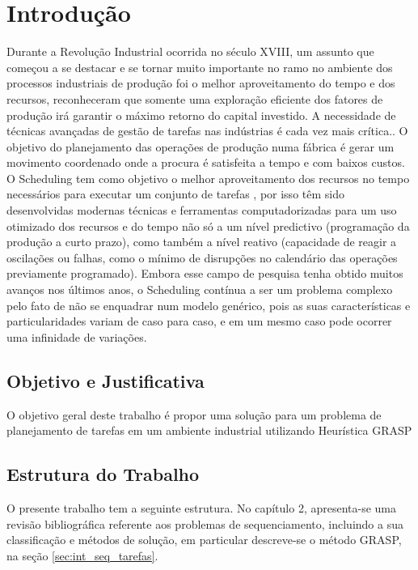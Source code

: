\chapter{Introdução}

Durante a Revolução Industrial ocorrida no século XVIII, um assunto que começou a se destacar e se tornar muito importante no ramo no ambiente dos processos industriais de produção foi o melhor aproveitamento do tempo e dos recursos, reconheceram que somente uma exploração eficiente dos fatores de produção irá garantir o máximo retorno do capital investido. A necessidade de técnicas avançadas de gestão de tarefas nas indústrias é cada vez mais crítica.. 
	O objetivo do planejamento das operações de produção numa fábrica é gerar um movimento coordenado onde a procura é satisfeita a tempo e com baixos custos. O Scheduling tem como objetivo o melhor aproveitamento dos recursos no tempo necessários para executar um conjunto de tarefas \cite{BAKER}, por isso têm sido desenvolvidas modernas técnicas e ferramentas computadorizadas para um uso otimizado dos recursos e do tempo não só a um nível predictivo (programação da produção a curto prazo), como também a nível reativo (capacidade de reagir a oscilações ou falhas, como o mínimo de disrupções no calendário das operações previamente programado).
	Embora esse campo de pesquisa tenha obtido muitos avanços nos últimos anos, o Scheduling contínua a ser um problema complexo pelo fato de não se enquadrar num modelo genérico, pois as suas características e particularidades variam de caso para caso, e em um mesmo caso pode ocorrer uma infinidade de variações.   

\section{Objetivo e Justificativa}

O objetivo geral deste trabalho é propor uma solução para um problema de planejamento de tarefas em um ambiente industrial utilizando Heurística GRASP

\section{Estrutura do Trabalho}

O presente trabalho tem a seguinte estrutura. No capítulo 2, apresenta-se uma revisão bibliográfica referente aos problemas de sequenciamento, incluindo a sua classificação e métodos de solução, em particular descreve-se o método GRASP, na seção \ref{sec:int_seq_tarefas}.
